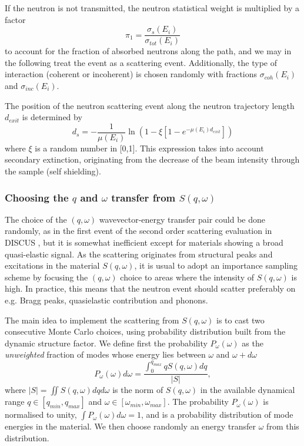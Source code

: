 If the neutron is not transmitted, the neutron statistical weight is multiplied by a factor
\begin{equation}
\pi_1 = \frac{\sigma_s(E_i)}{\sigma_{tot}(E_i)}
\end{equation}
to account for the fraction of absorbed neutrons along the path, and we may in the following treat the event as a scattering event.
Additionally, the type of interaction (coherent or incoherent) is chosen randomly with fractions $\sigma_{coh}(E_i)$ and $\sigma_{inc}(E_i)$.

The position of the neutron scattering event along the neutron trajectory length $d_{exit}$ is determined by \cite{Mildner77,discus}
\begin{equation}
d_{s} = -\frac{1}{\mu(E_i)} \ln(1 - \xi[1 -e^{-\mu(E_i) d_{exit}}])
\end{equation}
where $\xi$ is a random number in [0,1]. This expression takes into account secondary extinction, originating from the decrease of the beam intensity through the sample (self shielding).

\subsubsection{Choosing the $q$ and $\omega$ transfer from $S(q, \omega)$ }
\label{s:choose-qw}

The choice of the $(q, \omega)$ wavevector-energy transfer pair could be done randomly, as in the first event of the second order scattering evaluation in DISCUS \cite{discus}, but it is somewhat inefficient except for materials showing a broad quasi-elastic signal. As the scattering originates from structural peaks and excitations in the material $S(q, \omega)$, it is usual \cite{mscat} to adopt an importance sampling scheme by focusing the $(q, \omega)$ choice to areas where the intensity of $S(q, \omega)$ is high. In practice, this means that the neutron event should scatter preferably on e.g. Bragg peaks, quasielastic contribution and phonons.

The main idea to implement the scattering from $S(q, \omega)$ is to cast two consecutive Monte Carlo choices, using probability distribution built from the dynamic structure factor.
We define first the probability $P_{\omega}(\omega)$ as the \emph{unweighted} fraction of modes whose energy lies between $\omega$ and $\omega+d\omega$
\begin{equation}
P_{\omega}(\omega) d\omega = \frac{\int_0^{q_{max}} q S(q,\omega) dq}{|S|},
\end{equation}
where $|S| = \iint S(q,\omega) dq d\omega$ is the norm of $S(q,\omega)$ in the available dynamical range $q \in [q_{min}, q_{max}]$ and $\omega \in [\omega_{min}, \omega_{max}]$.
The probability $P_{\omega}(\omega)$ is normalised to unity, $\int P_{\omega}(\omega) d\omega = 1$, and is a probability distribution of mode energies in the material. We then choose randomly an energy transfer $\omega$ from this distribution.

